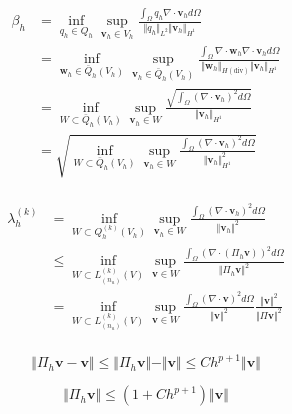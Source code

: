 \begin{equation}
\begin{split}
\beta_h &= \inf_{q_h \in Q_h} \sup_{\boldsymbol v_h \in V_h} \frac{\int_{\Omega} q_h \nabla \cdot \boldsymbol v_h d\Omega}{\Vert q_h \Vert_{L^2} \Vert \boldsymbol v_h \Vert_{H^1}} \\
    &= \inf_{\boldsymbol w_h \in \bar{Q}_h(V_h)} \sup_{\boldsymbol v_h \in \bar{Q}_h(V_h)} \frac{\int_{\Omega} \nabla \cdot \boldsymbol w_h \nabla \cdot \boldsymbol v_h d\Omega}{\Vert \boldsymbol w_h \Vert_{H(\textrm{div})} \Vert \boldsymbol v_h \Vert_{H^1}} \\ 
    &= \inf_{W \subset \bar{Q}_h(V_h)} \sup_{\boldsymbol v_h \in  W} \frac{\sqrt{ \int_{\Omega} (\nabla \cdot \boldsymbol v_h)^2 d\Omega}}{\Vert \boldsymbol v_h \Vert_{H^1}} \\
    &= \sqrt{\inf_{W \subset \bar{Q}_h(V_h)} \sup_{\boldsymbol v_h \in W} \frac{ \int_{\Omega} (\nabla \cdot \boldsymbol v_h)^2 d\Omega}{\Vert \boldsymbol v_h \Vert^2_{H^1}}} \\
\end{split}
\end{equation}



\begin{equation}
\begin{split}
    \lambda^{(k)}_h &= \inf_{W \subset Q_h^{(k)}(V_h)} \sup_{\boldsymbol v_h \in W} \frac{\int_{\Omega} (\nabla \cdot \boldsymbol v_h)^2 d\Omega}{\Vert \boldsymbol v_h \Vert^2} \\
    &\le \inf_{W \subset L^{(k)}_{(n_u)}(V)} \sup_{\boldsymbol v \in W} \frac{\int_{\Omega} (\nabla \cdot (\Pi_h \boldsymbol v))^2 d\Omega}{\Vert \Pi_h \boldsymbol v \Vert^2} \\
    &= \inf_{W \subset L^{(k)}_{(n_u)}(V)} \sup_{\boldsymbol v \in W} \frac{\int_{\Omega} (\nabla \cdot \boldsymbol v)^2 d\Omega}{\Vert \boldsymbol v \Vert^2}
    \frac{\Vert \boldsymbol v \Vert^2}{\Vert \Pi \boldsymbol v \Vert^2}\\
\end{split}
\end{equation}

\begin{equation}
\Vert \Pi_h \boldsymbol v - \boldsymbol v \Vert \le \Vert \Pi_h \boldsymbol v \Vert - \Vert \boldsymbol v \Vert \le Ch^{p+1}\Vert \boldsymbol v \Vert
\end{equation}

\begin{equation}
    \Vert \Pi_h \boldsymbol v \Vert \le (1+Ch^{p+1})\Vert \boldsymbol v \Vert
\end{equation}

